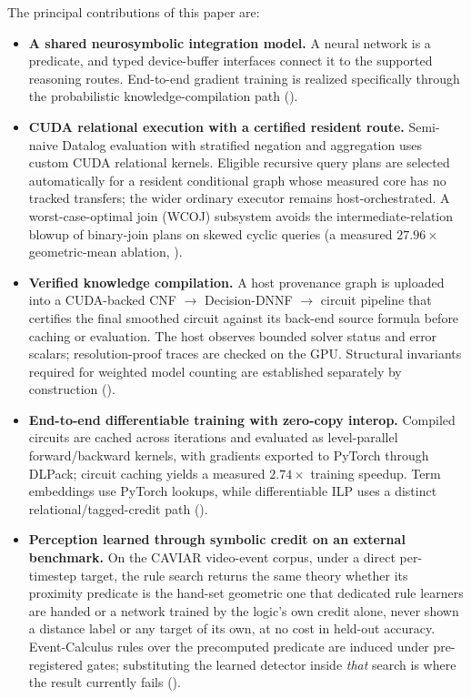 The principal contributions of this paper are:

\begin{itemize}
  \item \textbf{A shared neurosymbolic integration model.} A neural network is a predicate, and typed device-buffer interfaces connect it to the supported reasoning routes. End-to-end gradient training is realized specifically through the probabilistic knowledge-compilation path ().
  \item \textbf{CUDA relational execution with a certified resident route.} Semi-naive Datalog evaluation with stratified negation and aggregation uses custom CUDA relational kernels. Eligible recursive query plans are selected automatically for a resident conditional graph whose measured core has no tracked transfers; the wider ordinary executor remains host-orchestrated. A worst-case-optimal join (WCOJ) subsystem avoids the intermediate-relation blowup of binary-join plans on skewed cyclic queries (a measured $27.96\times$ geometric-mean ablation, ).
  \item \textbf{Verified knowledge compilation.} A host provenance graph is uploaded into a CUDA-backed CNF $\to$ Decision-DNNF $\to$ circuit pipeline that certifies the final smoothed circuit against its back-end source formula before caching or evaluation. The host observes bounded solver status and error scalars; resolution-proof traces are checked on the GPU. Structural invariants required for weighted model counting are established separately by construction ().
  \item \textbf{End-to-end differentiable training with zero-copy interop.} Compiled circuits are cached across iterations and evaluated as level-parallel forward/backward kernels, with gradients exported to PyTorch through DLPack; circuit caching yields a measured $2.74\times$ training speedup. Term embeddings use PyTorch lookups, while differentiable ILP uses a distinct relational/tagged-credit path ().
  \item \textbf{Perception learned through symbolic credit on an external benchmark.} On the CAVIAR video-event corpus, under a direct per-timestep target, the rule search returns the same theory whether its proximity predicate is the hand-set geometric one that dedicated rule learners are handed or a network trained by the logic's own credit alone, never shown a distance label or any target of its own, at no cost in held-out accuracy. Event-Calculus rules over the precomputed predicate are induced under pre-registered gates; substituting the learned detector inside \emph{that} search is where the result currently fails ().

\end{itemize}
